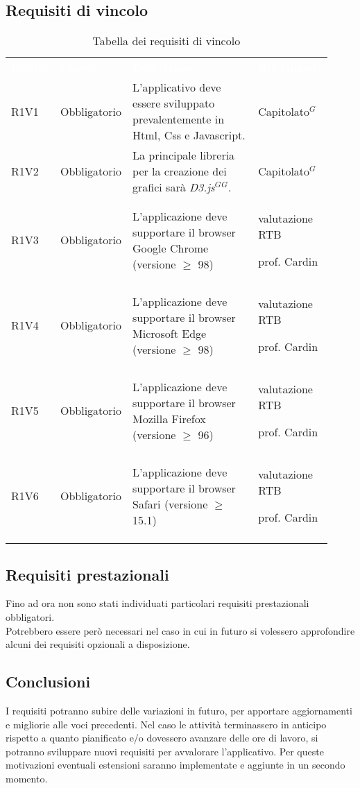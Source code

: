 \subsection{Requisiti di vincolo}
{\renewcommand{\arraystretch}{1.5}
\begin{longtable}{p{0.12\linewidth}p{0.15\linewidth}p{0.50\linewidth}p{0.15\linewidth}}
	\rowcolor[RGB]{33, 73, 50}
	\textcolor{white}{\textbf{Codice}} & \textcolor{white}{\textbf{Classe}} & \textcolor{white}{\textbf{Descrizione}} &
    \textcolor{white}{\textbf{Riferimenti}}\\

    \rowcolor[RGB]{216, 235, 171}
    R1V1 & Obbligatorio & L'applicativo deve essere sviluppato prevalentemente in Html, Css e Javascript. & Capitolato$^{G}$\\
    \rowcolor[RGB]{233, 245, 206}
    R1V2 & Obbligatorio & La principale libreria per la creazione dei grafici sarà \textit{D3.js$^{G}$}$^{G}$. & Capitolato$^{G}$\\
    \rowcolor[RGB]{216, 235, 171}
    R1V3 & Obbligatorio & L'applicazione deve supportare il browser Google Chrome (versione $\geq$ 98) & valutazione RTB \par prof. Cardin \\
    \rowcolor[RGB]{233, 245, 206}
    R1V4 & Obbligatorio & L'applicazione deve supportare il browser Microsoft Edge (versione $\geq$ 98) & valutazione RTB \par prof. Cardin \\
    \rowcolor[RGB]{216, 235, 171}
    R1V5 & Obbligatorio & L'applicazione deve supportare il browser Mozilla Firefox (versione $\geq$ 96) & valutazione RTB \par prof. Cardin \\
    \rowcolor[RGB]{233, 245, 206}
    R1V6 & Obbligatorio & L'applicazione deve supportare il browser Safari (versione $\geq$ 15.1) & valutazione RTB \par prof. Cardin \\

    \caption{Tabella dei requisiti di vincolo}
\end{longtable}
}

\subsection{Requisiti prestazionali}
Fino ad ora non sono stati individuati particolari requisiti prestazionali obbligatori.\\
Potrebbero essere però necessari nel caso in cui in futuro si volessero approfondire alcuni dei requisiti opzionali a disposizione.


\subsection{Conclusioni}
I requisiti potranno subire delle variazioni in futuro, per apportare aggiornamenti e migliorie alle voci precedenti.
Nel caso le attività terminassero in anticipo rispetto a quanto pianificato e/o dovessero avanzare delle ore di lavoro, si potranno sviluppare nuovi
requisiti per avvalorare l'applicativo. Per queste motivazioni eventuali estensioni saranno implementate e aggiunte in un secondo momento.
